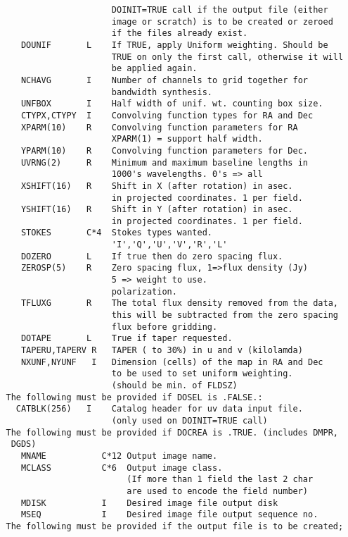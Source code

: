 \begin{verbatim}
                        DOINIT=TRUE call if the output file (either
                        image or scratch) is to be created or zeroed
                        if the files already exist.
      DOUNIF       L    If TRUE, apply Uniform weighting. Should be
                        TRUE on only the first call, otherwise it will
                        be applied again.
      NCHAVG       I    Number of channels to grid together for
                        bandwidth synthesis.
      UNFBOX       I    Half width of unif. wt. counting box size.
      CTYPX,CTYPY  I    Convolving function types for RA and Dec
      XPARM(10)    R    Convolving function parameters for RA
                        XPARM(1) = support half width.
      YPARM(10)    R    Convolving function parameters for Dec.
      UVRNG(2)     R    Minimum and maximum baseline lengths in
                        1000's wavelengths. 0's => all
      XSHIFT(16)   R    Shift in X (after rotation) in asec.
                        in projected coordinates. 1 per field.
      YSHIFT(16)   R    Shift in Y (after rotation) in asec.
                        in projected coordinates. 1 per field.
      STOKES       C*4  Stokes types wanted.
                        'I','Q','U','V','R','L'
      DOZERO       L    If true then do zero spacing flux.
      ZEROSP(5)    R    Zero spacing flux, 1=>flux density (Jy)
                        5 => weight to use.
                        polarization.
      TFLUXG       R    The total flux density removed from the data,
                        this will be subtracted from the zero spacing
                        flux before gridding.
      DOTAPE       L    True if taper requested.
      TAPERU,TAPERV R   TAPER ( to 30%) in u and v (kilolamda)
      NXUNF,NYUNF   I   Dimension (cells) of the map in RA and Dec
                        to be used to set uniform weighting.
                        (should be min. of FLDSZ)
   The following must be provided if DOSEL is .FALSE.:
     CATBLK(256)   I    Catalog header for uv data input file.
                        (only used on DOINIT=TRUE call)
   The following must be provided if DOCREA is .TRUE. (includes DMPR,
    DGDS)
      MNAME           C*12 Output image name.
      MCLASS          C*6  Output image class.
                           (If more than 1 field the last 2 char
                           are used to encode the field number)
      MDISK           I    Desired image file output disk
      MSEQ            I    Desired image file output sequence no.
   The following must be provided if the output file is to be created;

\end{verbatim}
